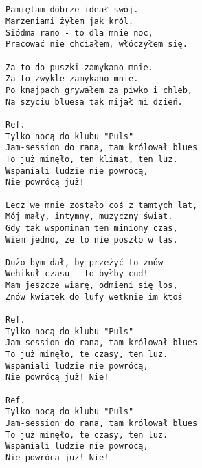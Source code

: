 \documentclass[12pt]{article}
\begin{document}
\subsection*{}
\begin{verbatim}
Pamiętam dobrze ideał swój.
Marzeniami żyłem jak król.
Siódma rano - to dla mnie noc,
Pracować nie chciałem, włóczyłem się.

Za to do puszki zamykano mnie.
Za to zwykle zamykano mnie.
Po knajpach grywałem za piwko i chleb,
Na szyciu bluesa tak mijał mi dzień.

Ref.
Tylko nocą do klubu "Puls"
Jam-session do rana, tam królował blues
To już minęło, ten klimat, ten luz.
Wspaniali ludzie nie powrócą,
Nie powrócą już!

Lecz we mnie zostało coś z tamtych lat,
Mój mały, intymny, muzyczny świat.
Gdy tak wspominam ten miniony czas,
Wiem jedno, że to nie poszło w las.

Dużo bym dał, by przeżyć to znów -
Wehikuł czasu - to byłby cud!
Mam jeszcze wiarę, odmieni się los,
Znów kwiatek do lufy wetknie im ktoś

Ref.
Tylko nocą do klubu "Puls"
Jam-session do rana, tam królował blues
To już minęło, te czasy, ten luz.
Wspaniali ludzie nie powrócą,
Nie powrócą już! Nie!

Ref.
Tylko nocą do klubu "Puls"
Jam-session do rana, tam królował blues
To już minęło, te czasy, ten luz.
Wspaniali ludzie nie powrócą,
Nie powrócą już! Nie!
\end{verbatim}
\clearpage
\end{document}
